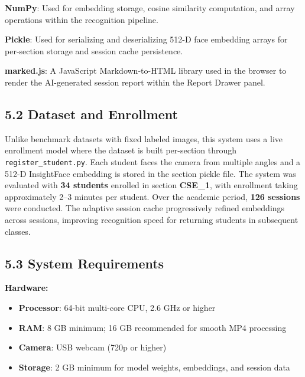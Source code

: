 \documentclass{report}
\begin{document}
\begin{itemize}
{    \item \textbf{NumPy}: Used for embedding storage, cosine similarity computation, and array\vspace{3pt} operations within the recognition pipeline.

    \item \textbf{Pickle}: Used for serializing and deserializing 512-D face embedding arrays for\vspace{3pt} per-section storage and session cache persistence.

    \item \textbf{marked.js}: A JavaScript Markdown-to-HTML library used in the browser to render\vspace{3pt} the AI-generated session report within the Report Drawer panel.
}
\end{itemize}

\subsection*{5.2 Dataset and Enrollment}
Unlike benchmark datasets with fixed labeled images, this system uses a live enrollment model where\vspace{3pt} the dataset is built per-section through \texttt{register\_student.py}. Each student faces the camera\vspace{3pt} from multiple angles and a 512-D InsightFace embedding is stored in the section pickle file. The\vspace{3pt} system was evaluated with \textbf{34 students} enrolled in section \textbf{CSE\_1}, with enrollment\vspace{3pt} taking approximately 2--3 minutes per student. Over the academic period, \textbf{126 sessions} were\vspace{3pt} conducted. The adaptive session cache progressively refined embeddings across sessions, improving\vspace{3pt} recognition speed for returning students in subsequent classes.

\subsection*{5.3 System Requirements}

\textbf{Hardware:}
\begin{itemize}
    \item \textbf{Processor}: 64-bit multi-core CPU, 2.6 GHz or higher
    \item \textbf{RAM}: 8 GB minimum; 16 GB recommended for smooth MP4 processing
    \item \textbf{Camera}: USB webcam (720p or higher)
    \item \textbf{Storage}: 2 GB minimum for model weights, embeddings, and session data
\end{itemize}
\end{document}
